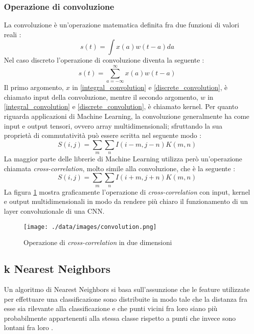 \subsubsection{Operazione di convoluzione}
La convoluzione è un'operazione matematica definita fra due funzioni di valori reali \cite{goodfellow2016deep}:
\begin{equation}
	s(t)=\int{x(a)w(t-a)da}
	\label{integral_convolution}
\end{equation}
Nel caso discreto l'operazione di convoluzione diventa la seguente \cite{goodfellow2016deep}:
\begin{equation}
	s(t)=\sum_{a=-\infty}^{\infty}{x(a)w(t-a)}
	\label{discrete_convolution}
\end{equation}
Il primo argomento, $x$ in \ref{integral_convolution} e \ref{discrete_convolution}, è chiamato input della convoluzione, mentre il secondo argomento, $w$ in \ref{integral_convolution} e \ref{discrete_convolution}, è chiamato kernel.
Per quanto riguarda applicazioni di Machine Learning, la convoluzione generalmente ha come input e output tensori, ovvero array multidimensionali; sfruttando la sua proprietà di commutatività può essere scritta nel seguente modo \cite{goodfellow2016deep}:
\begin{equation}
	S(i,j)=\sum_{m}{\sum_{n}{I(i-m,j-n)K(m,n)}}
	\label{multidimensional_convolution}
\end{equation}
La maggior parte delle librerie di Machine Learning utilizza però un'operazione chiamata \textit{cross-correlation}, molto simile alla convoluzione, che è la seguente \cite{goodfellow2016deep}:
\begin{equation}
S(i,j)=\sum_{m}{\sum_{n}{I(i+m,j+n)K(m,n)}}
\label{cross-correlation}
\end{equation}
La figura \ref{convolution} mostra graficamente l'operazione di \textit{cross-correlation} con input, kernel e output multidimensionali in modo da rendere più chiaro il funzionamento di un layer convoluzionale di una CNN.
\begin{figure}
	\centering
	\texttt{[image: ./data/images/convolution.png]}
	\caption{Operazione di \textit{cross-correlation} in due dimensioni \cite{goodfellow2016deep} }
	\label{convolution}
\end{figure}

\subsection{k Nearest Neighbors}
Un algoritmo di Nearest Neighbors si basa sull'assunzione che le feature utilizzate per effettuare una classificazione sono distribuite in modo tale che la distanza fra esse sia rilevante alla classificazione e che punti vicini fra loro siano più probabilmente appartenenti alla stessa classe rispetto a punti che invece sono lontani fra loro \cite{shalev2014understanding}. 


